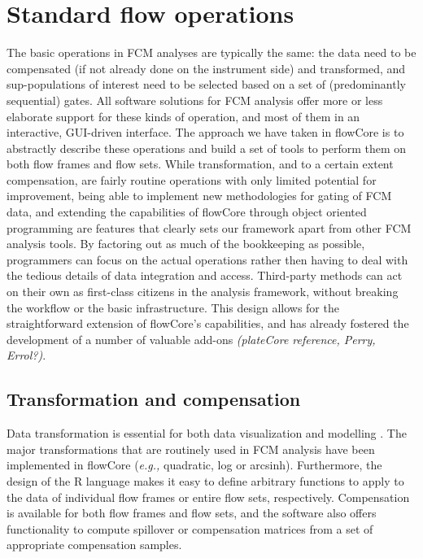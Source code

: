 \documentclass[12pt]{article}
\begin{document}
\section*{Standard flow operations}
The basic operations in FCM analyses are typically the same: the data
need to be compensated (if not already done on the instrument side)
and transformed, and sup-populations of interest need to be selected
based on a set of (predominantly sequential) gates. All software
solutions for FCM analysis offer more or less elaborate support for
these kinds of operation, and most of them in an interactive,
GUI-driven interface. The approach we have taken in flowCore is to
abstractly describe these operations and build a set of tools to
perform them on both flow frames and flow sets. While transformation,
and to a certain extent compensation, are fairly routine operations
with only limited potential for improvement, being able to implement
new methodologies for gating of FCM data, and extending the
capabilities of flowCore through object oriented programming are
features that clearly sets our framework apart from other FCM analysis
tools. By factoring out as much of the bookkeeping as possible,
programmers can focus on the actual operations rather then having to
deal with the tedious details of data integration and
access. Third-party methods can act on their own as first-class
citizens in the analysis framework, without breaking the workflow or
the basic infrastructure. This design allows for the straightforward
extension of flowCore's capabilities, and has already fostered the
development of a number of valuable add-ons
\citep{lo2008agf,sarkar2008ufv} \textit{(plateCore reference, Perry,
Errol?)}.




\subsection*{Transformation and compensation}
Data transformation is essential for both data visualization and
modelling \citep{lo2008agf}. The major transformations that are
routinely used in FCM analysis have been implemented in flowCore
(\textit{e.g.,} quadratic, log or arcsinh). Furthermore, the design of the R language makes
it easy to define arbitrary functions to apply to the data of
individual flow frames or entire flow sets, respectively. Compensation
is available for both flow frames and flow sets, and the software also
offers functionality to compute spillover or compensation matrices
from a set of appropriate compensation samples.
\end{document}
